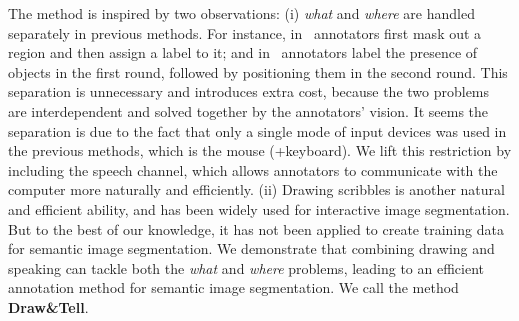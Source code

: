 \documentclass[runningheads]{llncs}
\begin{document}
The method is inspired by two observations: (i) \emph{what} and
\emph{where} are handled separately in previous methods. For instance,
in~\citep{open:surface} annotators first mask out a region and then
assign a label to it; and in~\citep{coco:eccv} annotators
label the presence of objects in the first round, followed by positioning
them in the second round. This separation is unnecessary and
introduces extra cost, because the two problems are interdependent and
solved together by the annotators’ vision. It seems the separation is due
to the fact that only a single mode of input devices was used in the
previous methods, which is the mouse (+keyboard). We lift this
restriction by including the speech channel, which allows annotators
to communicate with the computer more naturally and efficiently. 
(ii) Drawing scribbles is another natural and efficient ability, and
has been widely used for interactive image segmentation. But to the best 
of our knowledge, it has not been applied to create training data for 
semantic image segmentation. We demonstrate that combining drawing and 
speaking can tackle both the \emph{what} and \emph{where} problems, 
leading to an efficient annotation method for semantic image segmentation.
We call the method \textbf{Draw\&Tell}.  





\end{document}
